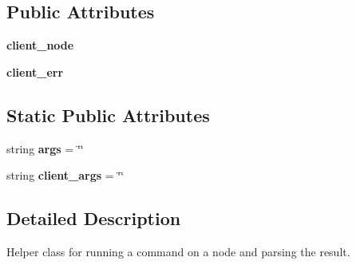 \subsection*{Public Attributes}
\begin{DoxyCompactItemize}
\item 
\hypertarget{classwlanemanetests_1_1_client_server_cmd_a874b7f85c3316c69f940bebb4afea9d7}{{\bfseries client\+\_\+node}}\label{classwlanemanetests_1_1_client_server_cmd_a874b7f85c3316c69f940bebb4afea9d7}

\item 
\hypertarget{classwlanemanetests_1_1_client_server_cmd_a43ec35ad1998a901f7a789c8b93698f6}{{\bfseries client\+\_\+err}}\label{classwlanemanetests_1_1_client_server_cmd_a43ec35ad1998a901f7a789c8b93698f6}

\end{DoxyCompactItemize}
\subsection*{Static Public Attributes}
\begin{DoxyCompactItemize}
\item 
\hypertarget{classwlanemanetests_1_1_client_server_cmd_a6540d3c6444bca3589109c138db8a235}{string {\bfseries args} = \char`\"{}\char`\"{}}\label{classwlanemanetests_1_1_client_server_cmd_a6540d3c6444bca3589109c138db8a235}

\item 
\hypertarget{classwlanemanetests_1_1_client_server_cmd_ab612f0a4e42a37fdf10a1943fa4c73b0}{string {\bfseries client\+\_\+args} = \char`\"{}\char`\"{}}\label{classwlanemanetests_1_1_client_server_cmd_ab612f0a4e42a37fdf10a1943fa4c73b0}

\end{DoxyCompactItemize}


\subsection{Detailed Description}
\begin{DoxyVerb}Helper class for running a command on a node and parsing the result. \end{DoxyVerb}
 

